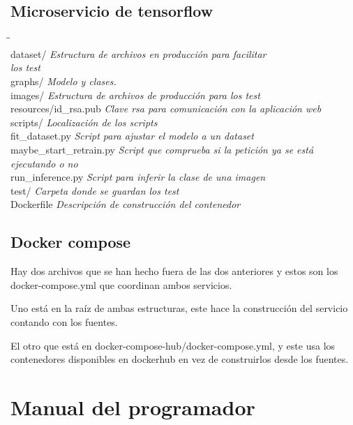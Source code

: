 \subsection{Microservicio de tensorflow}
\begin{tabbing}

\hphantom{tab }\= \hphantom{tab tab tab tab tab tab tab }\= \kill\\
dataset/ \> \> \textit{Estructura de archivos en producción para facilitar} \\
\> \> \textit{los test} \\
graphs/ \> \> \textit{Modelo y clases.} \\
images/ \> \> \textit{Estructura de archivos de producción para los test} \\
resources/id\_rsa.pub \> \> \textit{Clave rsa para comunicación con la aplicación web} \\
scripts/ \> \> \textit{Localización de los scripts} \\
\> fit\_dataset.py \> \textit{Script para ajustar el modelo a un dataset} \\
\> maybe\_start\_retrain.py \> \textit{Script que comprueba si la petición ya se está} \\ 
\> \> \textit{ejecutando o no} \\
\> run\_inference.py \> \textit{Script para inferir la clase de una imagen} \\
test/ \> \> \textit{Carpeta donde se guardan los test} \\
Dockerfile \> \> \textit{Descripción de construcción del contenedor} \\
\end{tabbing}

\subsection{Docker compose}
Hay dos archivos que se han hecho fuera de las dos anteriores y estos son los docker-compose.yml que coordinan ambos servicios. 

Uno está en la raíz de ambas estructuras, este hace la construcción del servicio contando con los fuentes.

El otro que está en docker-compose-hub/docker-compose.yml, y este usa los contenedores disponibles en dockerhub en vez de construirlos desde los fuentes.


\section{Manual del programador}

